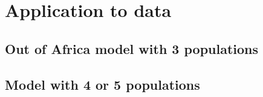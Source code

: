 \section{Application to data}
\subsection{Out of Africa model with 3 populations}
\subsection{Model with 4 or 5 populations}

 
